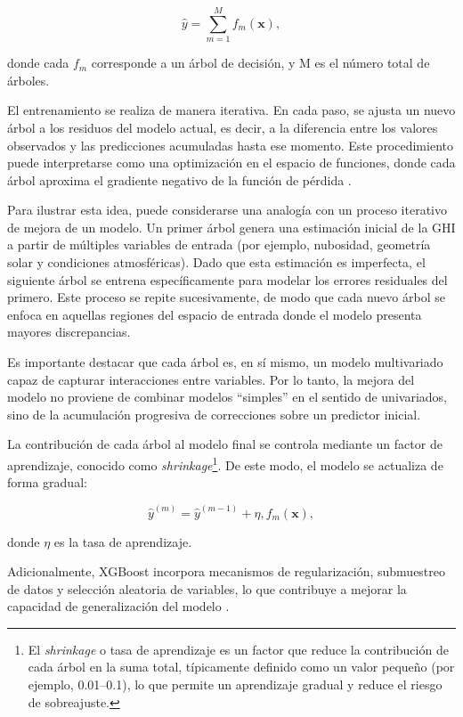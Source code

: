 \begin{equation}
\hat{y} = \sum_{m=1}^{M} f_m(\mathbf{x}),
\end{equation}

\noindent donde cada $f_m$ corresponde a un árbol de decisión, y M es el número total de árboles.

El entrenamiento se realiza de manera iterativa. En cada paso, se ajusta un nuevo árbol a los residuos del modelo actual, es decir, a la diferencia entre los valores observados y las predicciones acumuladas hasta ese momento. Este procedimiento puede interpretarse como una optimización en el espacio de funciones, donde cada árbol aproxima el gradiente negativo de la función de pérdida \citep{chen2016xgboost}.

Para ilustrar esta idea, puede considerarse una analogía con un proceso iterativo de mejora de un modelo. Un primer árbol genera una estimación inicial de la GHI a partir de múltiples variables de entrada (por ejemplo, nubosidad, geometría solar y condiciones atmosféricas). Dado que esta estimación es imperfecta, el siguiente árbol se entrena específicamente para modelar los errores residuales del primero. Este proceso se repite sucesivamente, de modo que cada nuevo árbol se enfoca en aquellas regiones del espacio de entrada donde el modelo presenta mayores discrepancias.

Es importante destacar que cada árbol es, en sí mismo, un modelo multivariado capaz de capturar interacciones entre variables. Por lo tanto, la mejora del modelo no proviene de combinar modelos “simples” en el sentido de univariados, sino de la acumulación progresiva de correcciones sobre un predictor inicial.

La contribución de cada árbol al modelo final se controla mediante un factor de aprendizaje, conocido como \textit{shrinkage}\footnote{El \textit{shrinkage} o tasa de aprendizaje es un factor que reduce la contribución de cada árbol en la suma total, típicamente definido como un valor pequeño (por ejemplo, 0.01–0.1), lo que permite un aprendizaje gradual y reduce el riesgo de sobreajuste.}. De este modo, el modelo se actualiza de forma gradual:

\begin{equation}
\hat{y}^{(m)} = \hat{y}^{(m-1)} + \eta , f_m(\mathbf{x}),
\end{equation}

\noindent donde $\eta$ es la tasa de aprendizaje.

Adicionalmente, XGBoost incorpora mecanismos de regularización, submuestreo de datos y selección aleatoria de variables, lo que contribuye a mejorar la capacidad de generalización del modelo \cite{xgboostdoc}.

